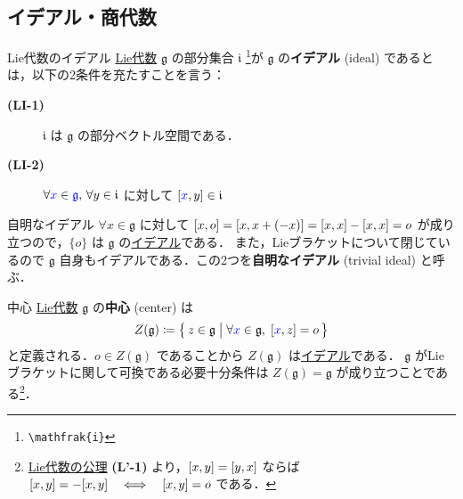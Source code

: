 \documentclass[rep_main]{subfiles}
\begin{document}
\subsection{イデアル・商代数}

\begin{mydef}[label=def:ideal-LieAlg]{Lie代数のイデアル}
    \hyperref[ax:LieAlg]{Lie代数} $\mathfrak{g}$ の部分集合 $\mathfrak{i}$ \footnote{\texttt{\textbackslash mathfrak\{i\}}}が $\mathfrak{g}$ の\textbf{イデアル} (ideal) であるとは，以下の2条件を充たすことを言う：
    \begin{description}
        \item[\textbf{(LI-1)}]  $\mathfrak{i}$ は $\mathfrak{g}$ の部分ベクトル空間である．
        \item[\textbf{(LI-2)}]  $\forall \textcolor{blue}{x} \in \textcolor{blue}{\mathfrak{g}},\, \forall y \in \mathfrak{i}$ に対して $\comm{\textcolor{blue}{x}}{y} \in \mathfrak{i}$
    \end{description}
\end{mydef}

\begin{myexample}[label=def:trivialIdeal-LieAlg]{自明なイデアル}
    $\forall x \in \mathfrak{g}$ に対して $\comm{x}{o} = \comm{x}{x + (-x)} = \comm{x}{x} - \comm{x}{x} = o$ が成り立つので，$\{o\}$ は $\mathfrak{g}$ の\hyperref[def:ideal-LieAlg]{イデアル}である．
    また，Lieブラケットについて閉じているので $\mathfrak{g}$ 自身もイデアルである．この2つを\textbf{自明なイデアル} (trivial ideal) と呼ぶ．
\end{myexample}


\begin{myexample}[label=def:center-LieAlg]{中心}
    \hyperref[ax:LieAlg]{Lie代数} $\mathfrak{g}$ の\textbf{中心} (center) は
    \begin{align}
        Z(\mathfrak{g}) \coloneqq \bigl\{\, z \in \mathfrak{g} \bigm| \forall \textcolor{blue}{x} \in \mathfrak{g},\; \comm{\textcolor{blue}{x}}{z} = o \,\bigr\} 
    \end{align}
    と定義される．$o \in Z(\mathfrak{g})$ であることから $Z(\mathfrak{g})$ は\hyperref[def:ideal-LieAlg]{イデアル}である．
    $\mathfrak{g}$ がLieブラケットに関して可換である必要十分条件は $Z(\mathfrak{g}) = \mathfrak{g}$ が成り立つことである\footnote{\hyperref[ax:LieAlg]{Lie代数の公理} \textsf{\textbf{(L'-1)}} より，$\comm{x}{y} = \comm{y}{x}$ ならば $\comm{x}{y} = - \comm{x}{y} \IFF \comm{x}{y} = o$ である．}．
\end{myexample}
\end{document}
